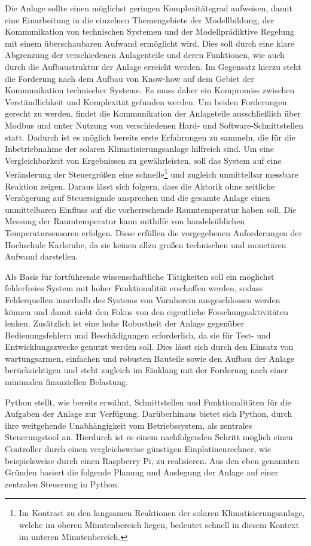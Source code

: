 Die Anlage sollte einen möglichst geringen Komplexitätsgrad aufweisen, damit eine Einarbeitung in die einzelnen Themengebiete der Modellbildung, der Kommunikation von technischen Systemen und der Modellprädiktive Regelung mit einem überschaubaren Aufwand ermöglicht wird. Dies soll durch eine klare Abgrenzung der verschiedenen Anlagenteile und deren Funktionen, wie auch durch die Aufbaustruktur der Anlage erreicht werden. Im Gegensatz hierzu steht die Forderung nach dem Aufbau von Know-how auf dem Gebiet der Kommunikation technischer Systeme. Es muss daher ein Kompromiss zwischen Verständlichkeit und Komplexität gefunden werden. Um beiden Forderungen gerecht zu werden, findet die Kommunikation der Anlageteile ausschließlich über Modbus und unter Nutzung von verschiedenen Hard- und Software-Schnittstellen statt. Dadurch ist es möglich bereits erste Erfahrungen zu sammeln, die für die Inbetriebnahme der solaren Klimatisierungsanlage hilfreich sind.
Um eine Vergleichbarkeit von Ergebnissen zu gewährleisten, soll das System auf eine Veränderung der Steuergrößen eine schnelle\footnote{Im Kontrast zu den langsamen Reaktionen der solaren Klimatisierungsanlage, welche im oberen Minutenbereich liegen, bedeutet schnell in diesem Kontext im unteren Minutenbereich.} und zugleich unmittelbar messbare Reaktion zeigen. 
Daraus lässt sich folgern, dass die Aktorik ohne zeitliche Verzögerung auf Steuersignale ansprechen und die gesamte Anlage einen unmittelbaren Einfluss auf die vorherrschende Raumtemperatur haben soll. 
Die Messung der Raumtemperatur kann mithilfe von handelsüblichen Temperatursensoren erfolgen. Diese erfüllen die vorgegebenen Anforderungen der Hochschule Karlsruhe, da sie keinen allzu großen technischen und monetären Aufwand darstellen.

Als Basis für fortführende wissenschaftliche Tätigkeiten soll ein möglichst fehlerfreies System mit hoher Funktionalität erschaffen werden, sodass Fehlerquellen innerhalb des Systems von Vornherein ausgeschlossen werden können und damit nicht den Fokus von den eigentliche Forschungsaktivitäten lenken.
Zusätzlich ist eine hohe Robustheit der Anlage gegenüber Bedienungsfehlern und Beschädigungen erforderlich, da sie für Test- und Entwicklungszwecke genutzt werden soll. Dies lässt sich durch den Einsatz von wartungsarmen, einfachen und robusten Bauteile sowie den Aufbau der Anlage berücksichtigen und steht zugleich im Einklang mit der Forderung nach einer minimalen finanziellen Belastung.

Python stellt, wie bereits erwähnt, Schnittstellen und Funktionalitäten für die Aufgaben der Anlage zur Verfügung. Darüberhinaus bietet sich Python, durch ihre weitgehende Unabhängigkeit vom Betriebssystem, als zentrales Steuerungstool an. Hierdurch ist es einem nachfolgenden Schritt möglich einen Controller durch einen vergleichsweise günstigen Einplatinenrechner, wie beispielsweise durch einen Raspberry Pi, zu realisieren. Aus den eben genannten Gründen basiert die folgende Planung und Auslegung der Anlage auf einer zentralen Steuerung in Python.

